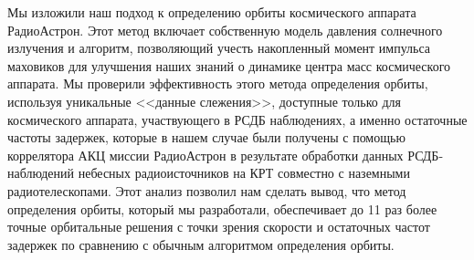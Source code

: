 Мы изложили наш подход к определению орбиты космического аппарата РадиоАстрон. Этот метод включает
собственную модель давления солнечного излучения и алгоритм, позволяющий учесть накопленный момент
импульса маховиков для улучшения наших знаний о динамике центра масс космического аппарата.
Мы проверили эффективность этого метода определения орбиты, используя уникальные <<данные
слежения>>, доступные только для космического аппарата, участвующего в РСДБ наблюдениях, а именно
остаточные частоты задержек, которые в нашем случае были получены с помощью коррелятора АКЦ миссии
РадиоАстрон в результате обработки данных РСДБ-наблюдений небесных радиоисточников на КРТ совместно
с наземными радиотелескопами. Этот анализ позволил нам сделать вывод, что метод определения орбиты,
который мы разработали, обеспечивает до 11 раз более точные орбитальные решения с точки зрения
скорости и остаточных частот задержек по сравнению с обычным алгоритмом определения орбиты.
